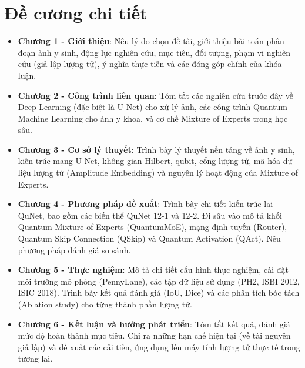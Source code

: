 \chapter*{Đề cương chi tiết}
\label{decuong}

\begin{itemize}
    \item \textbf{Chương 1 - Giới thiệu}: Nêu lý do chọn đề tài, giới thiệu bài toán phân đoạn ảnh y sinh, động lực nghiên cứu, mục tiêu, đối tượng, phạm vi nghiên cứu (giả lập lượng tử), ý nghĩa thực tiễn và các đóng góp chính của khóa luận.
    \item \textbf{Chương 2 - Công trình liên quan}: Tóm tắt các nghiên cứu trước đây về Deep Learning (đặc biệt là U-Net) cho xử lý ảnh, các công trình Quantum Machine Learning cho ảnh y khoa, và cơ chế Mixture of Experts trong học sâu.
    \item \textbf{Chương 3 - Cơ sở lý thuyết}: Trình bày lý thuyết nền tảng về ảnh y sinh, kiến trúc mạng U-Net, không gian Hilbert, qubit, cổng lượng tử, mã hóa dữ liệu lượng tử (Amplitude Embedding) và nguyên lý hoạt động của Mixture of Experts.
    \item \textbf{Chương 4 - Phương pháp đề xuất}: Trình bày chi tiết kiến trúc lai QuNet, bao gồm các biến thể QuNet 12-1 và 12-2. Đi sâu vào mô tả khối Quantum Mixture of Experts (QuantumMoE), mạng định tuyến (Router), Quantum Skip Connection (QSkip) và Quantum Activation (QAct). Nêu phương pháp đánh giá so sánh.
    \item \textbf{Chương 5 - Thực nghiệm}: Mô tả chi tiết cấu hình thực nghiệm, cài đặt môi trường mô phỏng (PennyLane), các tập dữ liệu sử dụng (PH2, ISBI 2012, ISIC 2018). Trình bày kết quả đánh giá (IoU, Dice) và các phân tích bóc tách (Ablation study) cho từng thành phần lượng tử.
    \item \textbf{Chương 6 - Kết luận và hướng phát triển}: Tóm tắt kết quả, đánh giá mức độ hoàn thành mục tiêu. Chỉ ra những hạn chế hiện tại (về tài nguyên giả lập) và đề xuất các cải tiến, ứng dụng lên máy tính lượng tử thực tế trong tương lai.
\end{itemize}
